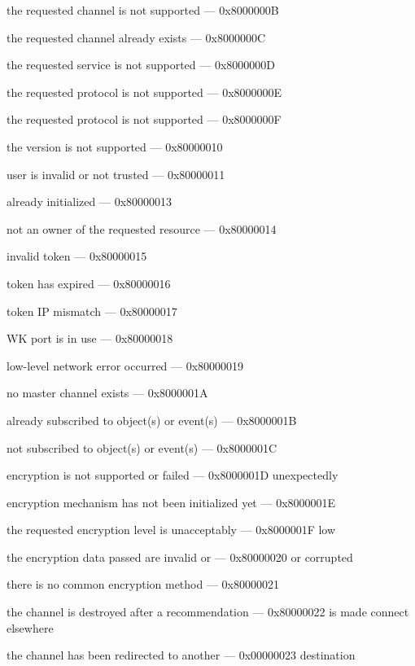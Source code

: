 \documentclass[titlepage,oneside]{book}
\begin{document}
the requested channel is not supported            --- 0x8000000B

the requested channel already exists              --- 0x8000000C

the requested service is not supported            --- 0x8000000D

the requested protocol is not supported           --- 0x8000000E

the requested protocol is not supported           --- 0x8000000F

the version is not supported                      --- 0x80000010

user is invalid or not trusted                    --- 0x80000011

already initialized                               --- 0x80000013

not an owner of the requested resource            --- 0x80000014

invalid token                                     --- 0x80000015

token has expired                                 --- 0x80000016

token IP mismatch                                 --- 0x80000017

WK port is in use                                 --- 0x80000018

low-level network error occurred                  --- 0x80000019

no master channel exists                          --- 0x8000001A

already subscribed to object(s) or event(s)       --- 0x8000001B

not subscribed to object(s) or event(s)           --- 0x8000001C

encryption is not supported or failed             --- 0x8000001D
unexpectedly

encryption mechanism has not been initialized yet --- 0x8000001E

the requested encryption level is unacceptably    --- 0x8000001F
low

the encryption data passed are invalid or         --- 0x80000020
or corrupted

there is no common encryption method              --- 0x80000021

the channel is destroyed after a recommendation   --- 0x80000022
is made connect elsewhere

the channel has been redirected to another        --- 0x00000023
destination
\end{document}
